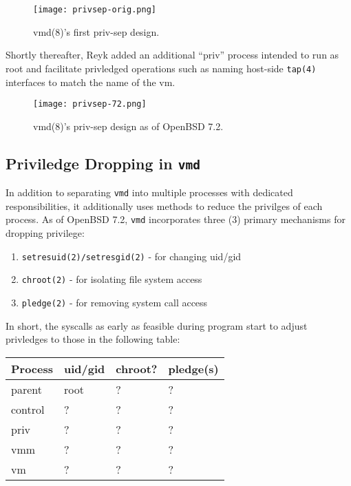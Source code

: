 \documentclass[conference]{IEEEtran}
\begin{document}
\begin{figure}
  \texttt{[image: privsep-orig.png]}
  \caption{vmd(8)'s first priv-sep design.}
\end{figure}

Shortly thereafter, Reyk added \cite{b7} an additional ``priv''
process intended to run as root and facilitate privledged operations
such as naming host-side \texttt{tap(4)} interfaces to match the name
of the vm.

\begin{figure}
  \texttt{[image: privsep-72.png]}
  \caption{vmd(8)'s priv-sep design as of OpenBSD 7.2.}
\end{figure}


\subsection{Priviledge Dropping in \texttt{vmd}}
In addition to separating \texttt{vmd} into multiple processes with
dedicated responsibilities, it additionally uses methods to reduce the
privilges of each process. As of OpenBSD 7.2, \texttt{vmd}
incorporates three (3) primary mechanisms for dropping privilege:

\begin{enumerate}
\item \texttt{setresuid(2)/setresgid(2)} - for changing uid/gid
\item \texttt{chroot(2)} - for isolating file system access
\item \texttt{pledge(2)} - for removing system call access
\end{enumerate}

In short, the syscalls as early as feasible during program start to
adjust privledges to those in the following table:

\begin{center}
\begin{tabular}{| l | l | l | l |}
  \hline
  Process & uid/gid & chroot? & pledge(s) \\ \hline
  parent & root & ? & ? \\ \hline
  control & ? & ? & ? \\ \hline
  priv & ? & ? & ? \\ \hline
  vmm & ? & ? & ? \\ \hline
  vm & ? & ? & ? \\
  \hline
\end{tabular}
\end{center}
\end{document}

